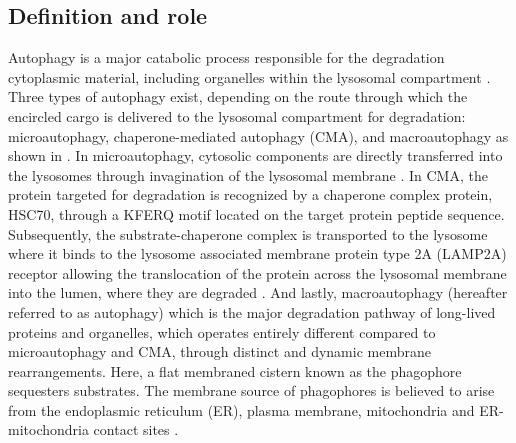 \subsection{Definition and role}
Autophagy is a major catabolic process responsible for the degradation cytoplasmic material, including organelles within the lysosomal compartment \citep{He2009,Nixon2011}. Three types of autophagy exist, depending on the route through which the encircled cargo is delivered to the lysosomal compartment for degradation: microautophagy, chaperone-mediated autophagy (CMA), and macroautophagy \citep{Boya2013} as shown in . In microautophagy, cytosolic components are directly transferred into the lysosomes through invagination of the lysosomal membrane \citep{Cai2012,Nixon2011}. In CMA, the protein targeted for degradation is recognized by a chaperone complex protein, HSC70, through a KFERQ motif located on the target protein peptide sequence. Subsequently, the substrate-chaperone complex is transported to the lysosome where it binds to the lysosome associated membrane protein type 2A (LAMP2A) receptor allowing the translocation of the protein across the lysosomal membrane into the lumen, where they are degraded \citep{Cuervo2014,Dice2007,Klionsky2010}. And lastly, macroautophagy (hereafter referred to as autophagy) which is the major degradation pathway of long-lived proteins and organelles, which operates entirely different compared to microautophagy and CMA, through distinct and dynamic membrane rearrangements. Here, a flat membraned cistern known as the phagophore sequesters substrates. The membrane source of phagophores is believed to arise from the  endoplasmic reticulum (ER), plasma membrane, mitochondria and ER-mitochondria contact sites \citep{Hailey2010,Hamasaki2013,Hayashi-Nishino2009,Ravikumar2010,sarkar2013,Yla-Anttila2009}.

